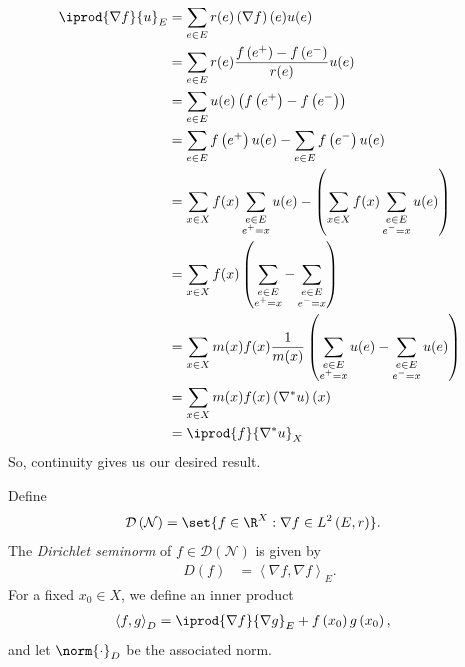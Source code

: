 \documentclass[10pt]{mypackage}
\begin{document}
\begin{align*}
  \iprod{\nabla f}{u}_E &= \sum_{e\in E} r(e) \left( \nabla f \right)(e)u(e)\\
                        &= \sum_{e\in E} r(e)\frac{f\left( e^+ \right)-f\left( e^{-} \right)}{r(e)}u(e)\\
                        &= \sum_{e\in E}u(e)\left( f\left( e^{+} \right)-f\left( e^{-} \right) \right)\\
                        &= \sum_{e\in E}f\left( e^{+} \right)u(e) - \sum_{e\in E}f\left( e^{-} \right)u(e)\\
                        &= \sum_{x\in X} f(x)\sum_{\substack{e\in E\\e^{+} = x}}u(e) - \left( \sum_{x\in X}f(x)\sum_{\substack{e\in E \\ e^{-}=x}}u(e) \right)\\
                        &= \sum_{x\in X}f(x)\left( \sum_{\substack{e\in E \\ e^{+}=x}} - \sum_{\substack{e\in E \\ e^{-}=x}} \right)\\
                        &= \sum_{x\in X}m(x)f(x)\frac{1}{m(x)}\left( \sum_{\substack{e\in E\\e^{+} = x}}u(e) - \sum_{\substack{e\in E \\ e^{-}=x}}u(e) \right)\\
                        &= \sum_{x\in X}m(x)f(x)\left( \nabla^{\ast}u \right)(x)\\
                        &= \iprod{f}{\nabla^{\ast}u}_X
\end{align*}
So, continuity gives us our desired result.
\begin{definition}
  Define
  \begin{align*}
    \mathcal{D}\left( \mathcal{N} \right) &= \set{f\in \R^X : \nabla f\in L^2\left( E,r \right)}.
  \end{align*}
  The \textit{Dirichlet seminorm} of $f\in \mathcal{D}\left( \mathcal{N} \right)$ is given by
  \begin{align*}
    D\left( f \right) &= \left\langle \nabla f,\nabla f \right\rangle_E.
  \end{align*}
  For a fixed $x_0\in X$, we define an inner product
  \begin{align*}
    \left\langle f,g \right\rangle_D &= \iprod{\nabla f}{\nabla g}_E + f\left( x_0 \right)g\left( x_0 \right),
  \end{align*}
  and let $ \norm{\cdot}_D $ be the associated norm.
\end{definition}
\end{document}
